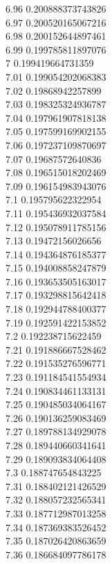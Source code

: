 {6.96	0.200888373743826\\
6.97	0.200520165067216\\
6.98	0.200152644897461\\
6.99	0.199785811897076\\
7	0.199419664731359\\
7.01	0.199054202068383\\
7.02	0.19868942257899\\
7.03	0.198325324936787\\
7.04	0.197961907818138\\
7.05	0.197599169902155\\
7.06	0.197237109870697\\
7.07	0.19687572640836\\
7.08	0.196515018202469\\
7.09	0.196154983943076\\
7.1	0.195795622322954\\
7.11	0.195436932037584\\
7.12	0.195078911785156\\
7.13	0.19472156026656\\
7.14	0.194364876185377\\
7.15	0.194008858247879\\
7.16	0.193653505163017\\
7.17	0.193298815642418\\
7.18	0.192944788400377\\
7.19	0.192591422153852\\
7.2	0.192238715622459\\
7.21	0.191886667528462\\
7.22	0.191535276596771\\
7.23	0.191184541554934\\
7.24	0.190834461133131\\
7.25	0.190485034064167\\
7.26	0.190136259083469\\
7.27	0.189788134929078\\
7.28	0.189440660341641\\
7.29	0.189093834064408\\
7.3	0.188747654843225\\
7.31	0.188402121426529\\
7.32	0.188057232565341\\
7.33	0.187712987013258\\
7.34	0.187369383526452\\
7.35	0.187026420863659\\
7.36	0.186684097786178\\
}
